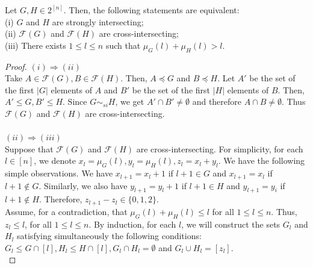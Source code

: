 \documentclass[10pt,a4paper]{amsart}
\begin{document}
\begin{lem}\label{lem2} Let $G,H \in 2^{[n]}$. Then, the following statements are equivalent:\\
(i) $G$ and $H$ are strongly intersecting;\\
(ii) $\mathcal{F}(G)$ and $\mathcal{F}(H)$ are cross-intersecting;\\
(iii) There exists $1 \leq l \leq n$ such that $\mu_{G}(l)+\mu_{H}(l) > l$.
\end{lem}

\begin{proof} $(i) \Rightarrow (ii)$\\
Take $A \in \mathcal{F}(G), B \in \mathcal{F}(H)$. Then, $A \preceq G$ and $B \preceq H$. Let $A'$ be the set of the first $|G|$ elements of $A$ and $B'$ be the set of the first $|H|$ elements of $B$. Then, $A' \leq G, B' \leq H$. Since $G \sim_{si} H$, we get $A' \cap B' \neq \emptyset$ and therefore $A \cap B \neq \emptyset$.
Thus $\mathcal{F}(G)$ and $\mathcal{F}(H)$ are cross-intersecting.\\ \\
$(ii) \Rightarrow (iii)$\\
Suppose that $\mathcal{F}(G)$ and $\mathcal{F}(H)$ are cross-intersecting. For simplicity, for each $l \in [n]$, we denote $x_{l}=\mu_{G}(l), y_{l}=\mu_{H}(l), z_{l}=x_{l}+y_{l}$. We have the following simple observations. We have $x_{l+1}=x_{l}+1$ if $l+1 \in G$ and $x_{l+1}=x_{l}$ if $l+1 \notin G$. Similarly, we also have $y_{l+1}=y_{l}+1$ if $l+1 \in H$ and $y_{l+1}=y_{i}$ if $l+1 \notin H$. Therefore, $z_{l+1}-z_{l} \in \{0,1,2\}$.\\
Assume, for a contradiction, that $\mu_{G}(l)+\mu_{H}(l) \leq l$ for all $1 \leq l \leq n$. Thus, $z_{l} \leq l$, for all $1 \leq l \leq n$. By induction, for each $l$, we will construct the sets $G_{l}$ and $H_{l}$ satisfying simultaneously the following conditions: $G_{l} \leq G \cap [l], H_{l} \leq H \cap [l], G_{l} \cap H_{l}= \emptyset$ and $G_{l} \cup H_{l}=[z_{l}]$.\\ 


\end{proof}
\end{document}
